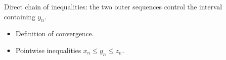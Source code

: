 \begin{remark*}
Direct chain of inequalities: the two outer sequences control the interval
containing $y_n$.
\end{remark*}

\begin{remark*}[Dependencies]
\begin{itemize}
  \item Definition of convergence.
  \item Pointwise inequalities $x_n \le y_n \le z_n$.
\end{itemize}
\end{remark*}
